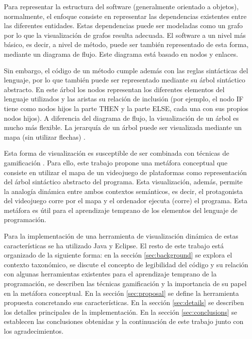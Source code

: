 \documentclass{llncs}
\begin{document}
Para representar la estructura del software (generalmente orientado a objetos), normalmente, el enfoque consiste en representar las dependencias existentes entre las diferentes entidades. Estas dependencias puede ser modeladas como un grafo por lo que la visualización de grafos resulta adecuada. El software a un nivel más básico, es decir, a nivel de método, puede ser también representado de esta forma, mediante un diagrama de flujo. Este diagrama está basado en nodos y enlaces.

Sin embargo, el código de un método cumple además con las reglas sintácticas del lenguaje, por lo que también puede ser representado mediante su árbol sintáctico abstracto. En este árbol los nodos representan los diferentes elementos del lenguaje utilizados y las aristas su relación de inclusión (por ejemplo, el nodo IF tiene como nodos hijos la parte THEN y la parte ELSE, cada una con sus propios nodos hijos). A diferencia del diagrama de flujo, la visualización de un árbol es mucho más flexible. La jerarquía de un árbol puede ser visualizada mediante un mapa (sin utilizar flechas) \cite{softwarevisualization}.

Esta forma de visualización es susceptible de ser combinada con técnicas de gamificación \cite{kumar2012gamification}. Para ello, este trabajo propone una metáfora conceptual que consiste en utilizar el mapa de un videojuego de plataformas como representación del árbol sintáctico abstracto del programa. Esta visualización, además, permite la analogía dinámica entre ambos contextos semánticos, es decir, el protagonista del videojuego corre por el mapa y el ordenador ejecuta (corre) el programa. Esta metáfora es útil para el aprendizaje temprano de los elementos del lenguaje de programación.

Para la implementación de una herramienta de visualización dinámica de estas características se ha utilizado Java y Eclipse. El resto de este trabajo está organizado de la siguiente forma: en la sección \ref{sec:background} se explora el contexto taxonómico, se discute el concepto de legibilidad del código y su relación con algunas herramientas existentes para el aprendizaje temprano de la programación, se describen las técnicas gamificación y la importancia de su papel en la metáfora conceptual. En la sección \ref{sec:proposal} se define la herramienta propuesta concretando sus características. En la sección \ref{sec:details} se describen los detalles principales de la implementación. En la sección \ref{sec:conclusions} se establecen las conclusiones obtenidas y la continuación de este trabajo junto con los agradecimientos. 
\end{document}
